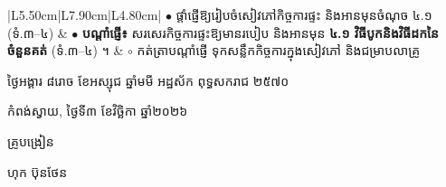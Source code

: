 \documentclass[a4paper,10pt]{article}
\begin{document}
{\begin{longtable}{|L{5.50cm}|L{7.90cm}|L{4.80cm}|}
$\bullet$ ផ្ដាំផ្ញើឱ្យរៀបចំសៀវភៅកិច្ចការផ្ទះ និងអានមុនចំណុច ៤.១ (ទំ.៣–៤)
&
$\bullet$ \textbf{បណ្ដាំផ្ញើ៖} សរសេរកិច្ចការផ្ទះឱ្យមានរបៀប និងអានមុន \textbf{៤.១ វិធីបូកនិងវិធីដកនៃចំនួនគត់} (ទំ.៣–៤) ។
&
$\circ$ កត់ត្រាបណ្ដាំផ្ញើ ទុកសន្លឹកកិច្ចការក្នុងសៀវភៅ និងជម្រាបលាគ្រូ \\
\hline
\end{longtable}}

\vspace{6pt}
{\centering
\hspace*{5.2cm}\begin{minipage}{11.5cm}
  \centering
  ថ្ងៃអង្គារ ៨រោច ខែអស្សុជ ឆ្នាំមមី អដ្ឋស័ក ពុទ្ធសករាជ ២៥៧០\par
  កំពង់ស្វាយ, ថ្ងៃទី៣ ខែវិច្ឆិកា ឆ្នាំ២០២៦\par
  \vspace{2pt}
  {\muol គ្រូបង្រៀន\par}
  \vspace{32pt}
  \hfill{\muol ហុក ប៊ុនថែន}\hspace*{1.4cm}
\end{minipage}\par}
\end{document}

